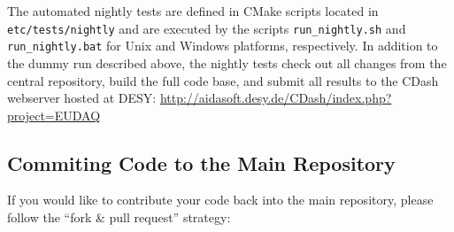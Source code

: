 The automated nightly tests are defined in CMake scripts located in
\texttt{etc/tests/nightly} and are executed by the scripts
\texttt{run\_nightly.sh} and \texttt{run\_nightly.bat} for Unix and
Windows platforms, respectively. In addition to the dummy run
described above, the nightly tests check out all changes from the
central repository, build the full code base, and submit all results
to the CDash webserver hosted at DESY: \url{http://aidasoft.desy.de/CDash/index.php?project=EUDAQ}

\subsection{Commiting Code to the Main Repository}
\label{sec:commiting}



If you would like to contribute your code back into the main repository, please follow the ``fork \& pull request'' strategy:


